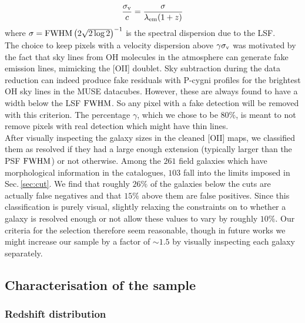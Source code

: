 \begin{equation}
	\frac{\sigma_{\rm{v}}}{c} = \frac{\sigma}{\lambda_{\rm{em}} (1+z)}
\end{equation}
where $\sigma = \rm{FWHM} \left (2 \sqrt{2 \log 2} \right )^{-1}$ is the spectral dispersion due to the LSF. \\

The choice to keep pixels with a velocity dispersion above $\gamma \sigma_{\rm{v}}$ was motivated by the fact that sky lines from OH molecules in the atmosphere can generate fake emission lines, mimicking the [OII] doublet. Sky subtraction during the data reduction can indeed produce fake residuals with P-cygni profiles for the brightest OH sky lines in the MUSE datacubes. However, these are always found to have a width below the LSF $\rm{FWHM}$. So any pixel with a fake detection will be removed with this criterion. The percentage $\gamma$, which we chose to be $80\%$, is meant to not remove pixels with real detection which might have thin lines.\\

After visually inspecting the galaxy sizes in the cleaned [OII] maps, we classified them as resolved if they had a large enough extension (typically larger than the PSF $\rm{FWHM}$) or not otherwise. Among the $261$ field galaxies which have morphological information in the catalogues, $103$ fall into the limits imposed in Sec.\,\ref{sec:cut}. We find that roughly $26\%$ of the galaxies below the cuts are actually false negatives and that $15\%$ above them are false positives. Since this classification is purely visual, slightly relaxing the constraints on to whether a galaxy is resolved enough or not allow these values to vary by roughly $10\%$. Our criteria for the selection therefore seem reasonable, though in future works we might increase our sample by a factor of $\sim 1.5$ by visually inspecting each galaxy separately.





\subsection{Characterisation of the sample}
\label{sec:sample_characterisation}

\subsubsection{Redshift distribution}

